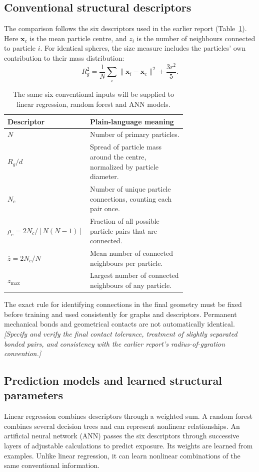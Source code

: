 \documentclass[11pt,a4paper]{article}
\newcommand{\pending}[1]{{\color{red}\textit{[#1]}}}
\begin{document}
\subsection{Conventional structural descriptors}
The comparison follows the six descriptors used in the earlier report (Table~\ref{tab:descriptors}). Here $\boldsymbol{x}_c$ is the mean particle centre, and $z_i$ is the number of neighbours connected to particle $i$. For identical spheres, the size measure includes the particles' own contribution to their mass distribution:
\begin{equation}
 R_g^2=\frac{1}{N}\sum_i\lVert\boldsymbol{x}_i-\boldsymbol{x}_c\rVert^2+\frac{3r^2}{5}.
\end{equation}
\begin{table}[htbp]
\centering\small
\caption{The same six conventional inputs will be supplied to linear regression, random forest and ANN models.}\label{tab:descriptors}
\begin{tabular}{@{}lp{0.71\linewidth}@{}}\toprule
Descriptor & Plain-language meaning\\\midrule
$N$ & Number of primary particles.\\
$R_g/d$ & Spread of particle mass around the centre, normalized by particle diameter.\\
$N_c$ & Number of unique particle connections, counting each pair once.\\
$\rho_c=2N_c/[N(N-1)]$ & Fraction of all possible particle pairs that are connected.\\
$\overline z=2N_c/N$ & Mean number of connected neighbours per particle.\\
$z_{\max}$ & Largest number of connected neighbours of any particle.\\\bottomrule
\end{tabular}
\end{table}

The exact rule for identifying connections in the final geometry must be fixed before training and used consistently for graphs and descriptors. Permanent mechanical bonds and geometrical contacts are not automatically identical. \pending{Specify and verify the final contact tolerance, treatment of slightly separated bonded pairs, and consistency with the earlier report's radius-of-gyration convention.}

\subsection{Prediction models and learned structural parameters}
Linear regression combines descriptors through a weighted sum. A random forest combines several decision trees and can represent nonlinear relationships. An artificial neural network (ANN) passes the six descriptors through successive layers of adjustable calculations to predict exposure. Its weights are learned from examples. Unlike linear regression, it can learn nonlinear combinations of the same conventional information.
\end{document}
